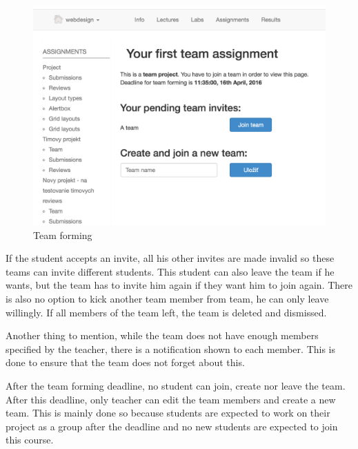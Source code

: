 \begin{figure}[h]
    \centering
    \includegraphics[width=\textwidth]{images/teamforming.png}
    \caption{Team forming}
    \label{team_forming}
\end{figure}

If the student accepts an invite, all his other invites are made invalid so these teams can invite different students. This student can also leave the team if he wants, but the team has to invite him again if they want him to join again. There is also no option to kick another team member from team, he can only leave willingly. If all members of the team left, the team is deleted and dismissed.

Another thing to mention, while the team does not have enough members specified by the teacher, there is a notification shown to each member. This is done to ensure that the team does not forget about this.

After the team forming deadline, no student can join, create nor leave the team. After this deadline, only teacher can edit the team members and create a new team. This is mainly done so because students are expected to work on their project as a group after the deadline and no new students are expected to join this course.

